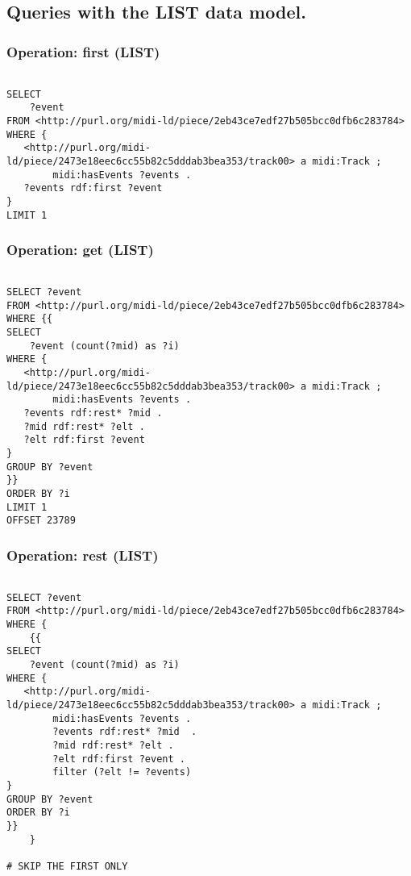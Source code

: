 \subsection{Queries with the LIST data model.}
\label{queries:LIST}

\subsubsection{Operation: first (LIST)}
\label{query:LIST:first}

\begin{lstlisting}[language=sparql]

SELECT
	?event
FROM <http://purl.org/midi-ld/piece/2eb43ce7edf27b505bcc0dfb6c283784>
WHERE {
   <http://purl.org/midi-ld/piece/2473e18eec6cc55b82c5dddab3bea353/track00> a midi:Track ;
        midi:hasEvents ?events .
   ?events rdf:first ?event
}
LIMIT 1

\end{lstlisting}

\subsubsection{Operation: get (LIST)}
\label{query:LIST:get}

\begin{lstlisting}[language=sparql]

SELECT ?event 
FROM <http://purl.org/midi-ld/piece/2eb43ce7edf27b505bcc0dfb6c283784>
WHERE {{
SELECT
	?event (count(?mid) as ?i)
WHERE {
   <http://purl.org/midi-ld/piece/2473e18eec6cc55b82c5dddab3bea353/track00> a midi:Track ;
        midi:hasEvents ?events .
   ?events rdf:rest* ?mid .
   ?mid rdf:rest* ?elt .
   ?elt rdf:first ?event
} 
GROUP BY ?event
}}
ORDER BY ?i
LIMIT 1
OFFSET 23789

\end{lstlisting}

\subsubsection{Operation: rest (LIST)}
\label{query:LIST:rest}

\begin{lstlisting}[language=sparql]

SELECT ?event 
FROM <http://purl.org/midi-ld/piece/2eb43ce7edf27b505bcc0dfb6c283784>
WHERE {
	{{
SELECT
	?event (count(?mid) as ?i)
WHERE {
   <http://purl.org/midi-ld/piece/2473e18eec6cc55b82c5dddab3bea353/track00> a midi:Track ;
        midi:hasEvents ?events .
		?events rdf:rest* ?mid  .
		?mid rdf:rest* ?elt .
		?elt rdf:first ?event .
		filter (?elt != ?events)
} 
GROUP BY ?event
ORDER BY ?i
}}
	}
	
# SKIP THE FIRST ONLY

\end{lstlisting}

